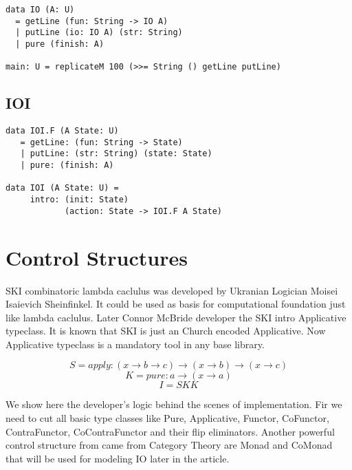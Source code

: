 \documentclass{article}
\begin{document}
\begin{lstlisting}[mathescape=true]
data IO (A: U)
  = getLine (fun: String -> IO A)
  | putLine (io: IO A) (str: String)
  | pure (finish: A)

main: U = replicateM 100 (>>= String () getLine putLine)
\end{lstlisting}

\subsection{IOI}

\begin{lstlisting}[mathescape=true]
data IOI.F (A State: U)
   = getLine: (fun: String -> State)
   | putLine: (str: String) (state: State)
   | pure: (finish: A)

data IOI (A State: U) =
     intro: (init: State)
            (action: State -> IOI.F A State)
\end{lstlisting}

\newpage
\section{Control Structures}

SKI combinatoric lambda caclulus was developed by Ukranian Logician
Moisei Isaievich Sheinfinkel. It could be used as basis for computational
foundation just like lambda caclulus. Later Connor McBride developer the SKI
intro Applicative typeclass. It is known that SKI is just an Church
encoded Applicative. Now Applicative typeclass is a mandatory tool in any base library.

\begin{equation}
 S = apply : (x \rightarrow b \rightarrow c) \rightarrow (x \rightarrow b) \rightarrow (x \rightarrow c)
\end{equation}
\begin{equation}
 K = pure  : a \rightarrow (x \rightarrow a)
\end{equation}
\begin{equation}
 I = S K K
\end{equation}

We show here the developer's logic behind the scenes of implementation. Fir we need
to cut all basic type classes like Pure, Applicative, Functor, CoFunctor,
ContraFunctor, CoContraFunctor and their flip eliminators. Another powerful control
structure from came from Category Theory are Monad and CoMonad that will be used
for modeling IO later in the article.
\end{document}
